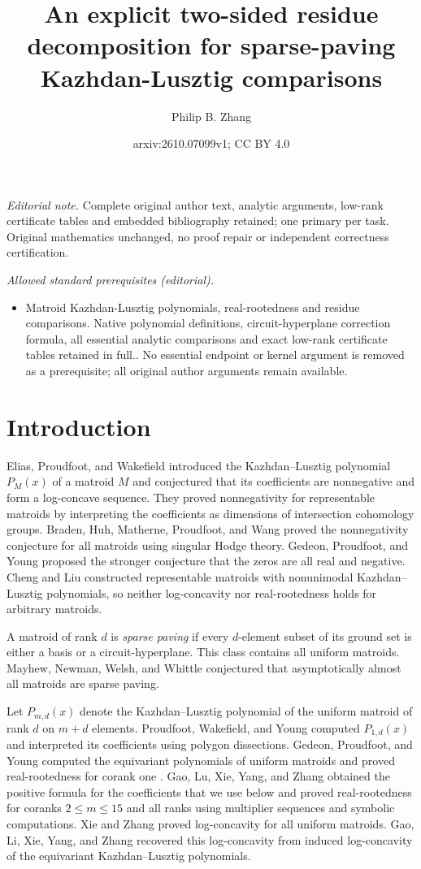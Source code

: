 \documentclass[10pt,a4paper]{article}
\title{An explicit two-sided residue decomposition for sparse-paving Kazhdan-Lusztig comparisons}
\author{Philip B. Zhang}
\date{arxiv:2610.07099v1; CC BY 4.0}
\numberwithin{equation}{section}
\theoremstyle{remark}\newtheorem{remark}[theorem]{Remark}
\begin{document}
\maketitle
\noindent\textit{Editorial note.} Complete original author text, analytic arguments, low-rank certificate tables and embedded bibliography retained; one primary per task. Original mathematics unchanged, no proof repair or independent correctness certification.\par\medskip
\noindent\textit{Allowed standard prerequisites (editorial).}\begin{itemize}
\item Matroid Kazhdan-Lusztig polynomials, real-rootedness and residue comparisons. Native polynomial definitions, circuit-hyperplane correction formula, all essential analytic comparisons and exact low-rank certificate tables retained in full.. No essential endpoint or kernel argument is removed as a prerequisite; all original author arguments remain available.
\end{itemize}\medskip
\section{Introduction}

Elias, Proudfoot, and Wakefield \cite{EPW} introduced the
Kazhdan--Lusztig polynomial $P_M(x)$ of a matroid $M$ and conjectured
that its coefficients are nonnegative and form a log-concave sequence.
They proved nonnegativity for representable matroids by interpreting the coefficients
as dimensions of intersection cohomology groups. Braden, Huh, Matherne, Proudfoot,
and Wang \cite{BHMPW} proved the nonnegativity conjecture for all matroids
using singular Hodge theory. Gedeon, Proudfoot, and Young
\cite{GPY} proposed the stronger conjecture that the
zeros are all real and negative. Cheng and Liu \cite{CL} constructed
representable matroids with nonunimodal Kazhdan--Lusztig polynomials,
so neither log-concavity nor real-rootedness holds for arbitrary
matroids.

A matroid of rank $d$ is \emph{sparse paving} if every $d$-element
subset of its ground set is either a basis or a circuit-hyperplane.
This class contains all uniform matroids. Mayhew, Newman, Welsh, and
Whittle \cite{MNWW} conjectured that asymptotically almost all matroids
are sparse paving.

Let $P_{m,d}(x)$ denote the
Kazhdan--Lusztig polynomial of the uniform matroid of rank $d$ on
$m+d$ elements. Proudfoot, Wakefield, and Young
\cite{PWY} computed $P_{1,d}(x)$ and interpreted its coefficients
using polygon dissections. Gedeon, Proudfoot, and Young
computed the equivariant polynomials of uniform matroids \cite{GPYeq}
and proved real-rootedness for corank one \cite[Theorem~3.3]{GPY}.
Gao, Lu, Xie, Yang, and
Zhang \cite{GLXYZ} obtained the positive formula for the coefficients that we use
below and proved real-rootedness for coranks $2\le m\le15$ and all
ranks using multiplier sequences and symbolic computations. Xie and Zhang \cite{XZ} proved
log-concavity for all uniform matroids. Gao, Li, Xie, Yang, and Zhang
\cite{GLiXYZ} recovered this log-concavity from induced log-concavity of
the equivariant Kazhdan--Lusztig polynomials.
\end{document}
